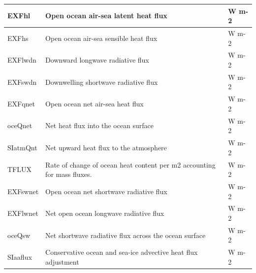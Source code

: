 \begin{longtable}{|m{}|m{}|m{}|}
EXFhl &Open ocean air-sea latent heat flux &W m-2  \\ \hline
EXFhs &Open ocean air-sea sensible heat flux &W m-2  \\ \hline
EXFlwdn &Downward longwave radiative flux &W m-2  \\ \hline
EXFswdn &Downwelling shortwave radiative flux &W m-2  \\ \hline
EXFqnet &Open ocean net air-sea heat flux &W m-2  \\ \hline
oceQnet &Net heat flux into the ocean surface &W m-2  \\ \hline
SIatmQnt &Net upward heat flux to the atmosphere &W m-2  \\ \hline
TFLUX &Rate of change of ocean heat content per m2 accounting for mass fluxes. &W m-2  \\ \hline
EXFswnet &Open ocean net shortwave radiative flux &W m-2  \\ \hline
EXFlwnet &Net open ocean longwave radiative flux &W m-2  \\ \hline
oceQsw &Net shortwave radiative flux across the ocean surface &W m-2  \\ \hline
SIaaflux &Conservative ocean and sea-ice advective heat flux adjustment &W m-2  \\ \hline
\end{longtable}

\newp
\pagebreak
